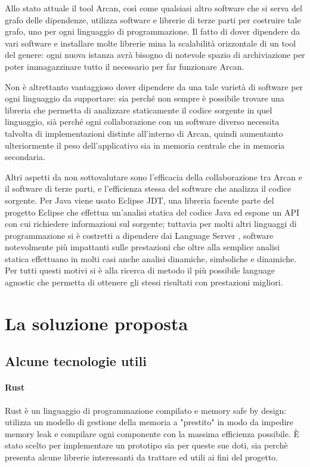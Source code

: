 Allo stato attuale il tool Arcan, cos\`i come qualsiasi altro software che si serva del grafo delle dipendenze, utilizza software e librerie di terze parti per costruire tale grafo, uno per ogni linguaggio di programmazione. Il fatto di dover dipendere da vari software e installare molte librerie mina la scalabilit\`a orizzontale di un tool del genere: ogni nuova istanza avr\`a bisogno di notevole spazio di archiviazione per poter immagazzinare tutto il necessario per far funzionare Arcan.

Non \`e altrettanto vantaggioso dover dipendere da una tale variet\`a di software per ogni linguaggio da supportare: sia perch\'e non sempre \`e possibile trovare una libreria che permetta di analizzare staticamente il codice sorgente in quel linguaggio, si\`a perch\'e ogni collaborazione con un software diverso necessita talvolta di implementazioni distinte all'interno di Arcan, quindi aumentanto ulteriormente il peso dell'applicativo sia in memoria centrale che in memoria secondaria.

Altri aspetti da non sottovalutare sono l'efficacia della collaborazione tra Arcan e il software di terze parti, e l'efficienza stessa del software che analizza il codice sorgente. Per Java viene usato Eclipse JDT, una libreria facente parte del progetto Eclipse che effettua un'analisi statica del codice Java ed espone un API con cui richiedere informazioni sul sorgente; tuttavia per molti altri linguaggi di programmazione si \`e costretti a dipendere dai Language Server \cite{LanguageServer}, software notevolmente pi\`u impattanti sulle prestazioni che oltre alla semplice analisi statica effettuano in molti casi anche analisi dinamiche, simboliche e dinamiche. Per tutti questi motivi si \`e alla ricerca di metodo il pi\`u possibile language agnostic che permetta di ottenere gli stessi risultati con prestazioni migliori.

\section{La soluzione proposta}
\subsection{Alcune tecnologie utili}

\paragraph{Rust}

Rust \cite{blandy2017programming} \`e un linguaggio di programmazione compilato e memory safe by design: utilizza un modello di gestione della memoria a "prestito" in modo da impedire memory leak e compilare ogni componente con la massima efficienza possibile. \`E stato scelto per implementare un prototipo sia per queste sue doti, sia perch\`e presenta alcune librerie interessanti da trattare ed utili ai fini del progetto.

